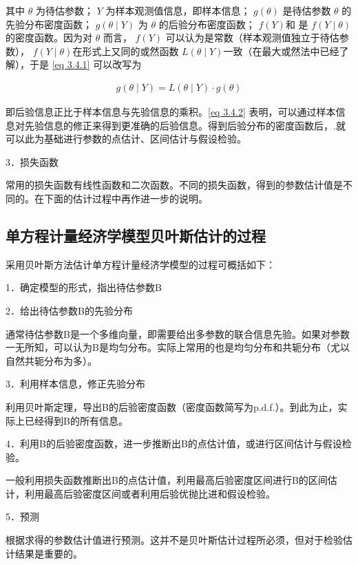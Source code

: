 		其中 $  \theta $ 为待估参数； $ Y $ 为样本观测值信息，即样本信息； $ g(\theta) $ 
		是待估参数 $  \theta $  的先验分布密度函数； $ g(\theta \mid Y) $ 为 $  \theta $ 的后验分布密度函数； 
		$ f(Y) $和 是 $ f(Y \mid \theta)  $ 的密度函数。因为对 $  \theta $  而言， 
		$ f(Y) $ 可以认为是常数（样本观测值独立于待估参数）， $ f(Y \mid \theta)  $在形式上又同的或然函数
		$ L (\theta \mid Y)  $一致（在最大或然法中已经了解），于是 \ref{eq 3.4.1} 可以改写为
		
		\vspace{-1em}
		\begin{eqnarray}  
		g(\theta \mid Y) = L(\theta \mid Y) \cdot g(\theta) 
		\label{eq 3.4.2} 
		\end{eqnarray}
		
		即后验信息正比于样本信息与先验信息的乘积。\ref{eq 3.4.2} 表明，可以通过样本信息对先验信息的修正来得到更准确的后验信息。得到后验分布的密度函数后，.就可以此为基础进行参数的点估计、区间估计与假设检验。
		
		3．损失函数
		
		常用的损失函数有线性函数和二次函数。不同的损失函数，得到的参数估计值是不同的。在下面的估计过程中再作进一步的说明。
		
	\subsection{单方程计量经济学模型贝叶斯估计的过程}
	
		采用贝叶斯方法估计单方程计量经济学模型的过程可概括如下：
		
		1．确定模型的形式，指出待估参数B
		
		2．给出待估参数B的先验分布
		
		通常待估参数B是一个多维向量，即需要给出多参数的联合信息先验。如果对参数一无所知，可以认为B是均匀分布。实际上常用的也是均匀分布和共轭分布（尤以自然共轭分布为多）。
		
		3．利用样本信息，修正先验分布
		
		利用贝叶斯定理，导出B的后验密度函数（密度函数简写为p.d.f.）。到此为止，实际上已经得到B的所有信息。
		
		4．利用B的后验密度函数，进一步推断出B的点估计值，或进行区间估计与假设检验。
		
		一般利用损失函数推断出B的点估计值，利用最高后验密度区间进行B的区间估计，利用最高后验密度区间或者利用后验优抛比进和假设检验。
		
		5．预测
		
		根据求得的参数估计值进行预测。这并不是贝叶斯估计过程所必须，但对于检验估计结果是重要的。
		
